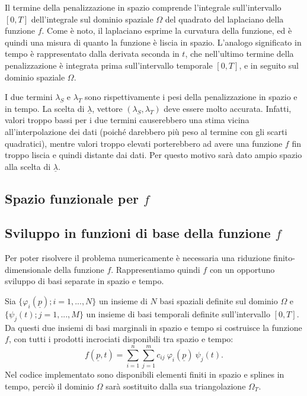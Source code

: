 \documentclass[a4paper,11pt,twoside,openright]{book}							%
\begin{document}
Il termine della penalizzazione in spazio comprende l'integrale sull'intervallo $[0,T]$ dell'integrale sul dominio spaziale $\Omega$ del quadrato del laplaciano della funzione $f$. Come è noto, il laplaciano esprime la curvatura della funzione, ed è quindi una misura di quanto la funzione è liscia in spazio. L'analogo significato in tempo è rappresentato dalla derivata seconda in $t$, che nell'ultimo termine della penalizzazione è integrata prima sull'intervallo temporale $[0,T]$, e in seguito sul dominio spaziale $\Omega$.

I due termini $\lambda_S$ e $\lambda_T$ sono rispettivamente i pesi della penalizzazione in spazio e in tempo. La scelta di $\underline \lambda$, vettore $ (\lambda_S,\lambda_T) $ deve essere molto accurata. Infatti, valori troppo bassi per i due termini causerebbero una stima vicina all'interpolazione dei dati (poiché darebbero più peso al termine con gli scarti quadratici), mentre valori troppo elevati porterebbero ad avere una funzione $f$ fin troppo liscia e quindi distante dai dati. Per questo motivo sarà dato ampio spazio alla scelta di $\underline \lambda$.

\subsection*{Spazio funzionale per $f$}

\subsection*{Sviluppo in funzioni di base della funzione $f$}

Per poter risolvere il problema numericamente è necessaria una riduzione finito-dimensionale della funzione $f$. Rappresentiamo quindi $f$ con un opportuno sviluppo di basi separate in spazio e tempo.

Sia $\{\varphi_i(\underline p); i=1, ... , N\}$ un insieme di $N$ basi spaziali definite sul dominio $\Omega$ e $\{\psi_j(t); j=1, ... , M\}$ un insieme di basi temporali definite sull'intervallo $[0,T]$. Da questi due insiemi di basi marginali in spazio e tempo si costruisce la funzione $f$, con tutti i prodotti incrociati disponibili tra spazio e tempo:
\begin{equation} 
\label{eq:basisexp}
f(\underline p,t)=\sum_{i=1}^n \sum_{j=1}^m c_{ij}\ \varphi_i(\underline p)\ \psi_j(t) .
\end{equation}
Nel codice implementato sono disponibili elementi finiti in spazio e splines in tempo, perciò il dominio $\Omega$ sarà sostituito dalla sua triangolazione $\Omega_T$.
\end{document}
